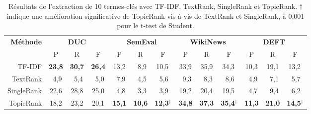     \begin{table}
      \centering
      \begin{tabular}{@{~}r@{~~}c@{~~}c@{~~}c@{~~}c@{~~}c@{~~}c@{~~}c@{~~}c@{~~}c@{~~}c@{~~}c@{~~}c@{~}}
        \toprule
        \multirow{2}{*}[-2pt]{\textbf{Méthode}} & \multicolumn{3}{c}{\textbf{DUC}} & \multicolumn{3}{c}{\textbf{SemEval}} & \multicolumn{3}{c}{\textbf{WikiNews}} & \multicolumn{3}{c}{\textbf{DEFT}}\\
        \cmidrule(r){2-4}\cmidrule(r){5-7}\cmidrule(r){8-10}\cmidrule{11-13}
        & P & R & F & P & R & F & P & R & F & P & R & F\\
        \midrule
        TF-IDF & \textbf{23,8} & \textbf{30,7} & \textbf{26,4} & 13,2 & $~~$8,9 & 10,5$^{~}$ & 33,9 & 35,9 & 34,3$^{~}$ & 10,3 & 19,1 & 13,2$^{~}$\\
        TextRank & $~~$4,9 & $~~$5,4 & $~~$5,0 & $~~$7,9 & $~~$4,5 & $~~$5,6$^{~}$ & $~~$9,3 & $~~$8,3 & $~~$8,6$^{~}$ & $~~$4,9 & $~~$7,1 & $~~$5,7$^{~}$\\
        SingleRank & 22,6 & 28,8 & 25,0 & $~~$4,8 & $~~$3,3 & $~~$3,9$^{~}$ & 19,2 & 20,4 & 19,5$^{~}$ & $~~$4,7 & $~~$9,4 & $~~$6,2$^{~}$\\
        TopicRank & 18,2 & 23,2 & 20,1 & \textbf{15,1} & \textbf{10,6} & \textbf{12,3}$^\dagger$ & \textbf{34,8} & \textbf{37,3} & \textbf{35,4}$^\dagger$ & \textbf{11,3} & \textbf{21,0} & \textbf{14,5}$^\dagger$\\
        \bottomrule
      \end{tabular}
      \caption{Résultats de l'extraction de 10 termes-clés avec TF-IDF,
               TextRank, SingleRank et TopicRank. $\dagger$ indique une
               amélioration significative de TopicRank vis-à-vis de TextRank et
               SingleRank, à 0,001 pour le t-test de Student.
               \label{tab:resultats_globaux}}
    \end{table}

